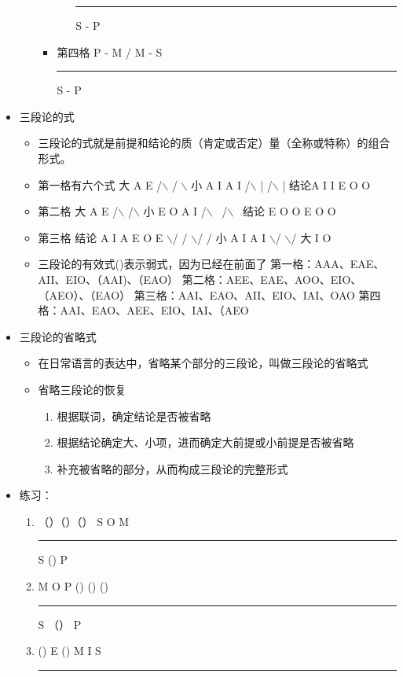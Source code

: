 \documentclass[11pt]{article}
\begin{document}
\begin{itemize}
\begin{itemize}
\begin{itemize}
\begin{itemize}
\rule{\linewidth}{0.5pt}
S - P
\end{itemize}
\item 第四格
P - M
  /
M - S

\rule{\linewidth}{0.5pt}
S - P
\end{itemize}
\end{itemize}
\item 三段论的式
\begin{itemize}
\item 三段论的式就是前提和结论的质（肯定或否定）量（全称或特称）的组合形式。
\item 第一格有六个式
大     A      E
      /$\backslash$    / $\backslash$
小   A  I   A  I
    /$\backslash$  |  /$\backslash$  |
结论A I  I E O  O
\item 第二格
大     A      E
      /$\backslash$     /$\backslash$
小    E O    A I
     /$\backslash$ \   /$\backslash$ \
结论 E O O  E O O
\item 第三格
结论   A  I A  E O E
       $\backslash$/ /    $\backslash$/ /
小      A I     A I
        $\backslash$/      $\backslash$/
大       I       O
\item 三段论的有效式()表示弱式，因为已经在前面了
第一格：AAA、EAE、AII、EIO、（AAI)、（EAO）
第二格：AEE、EAE、AOO、EIO、（AEO）、（EAO）
第三格：AAI、EAO、AII、EIO、IAI、OAO
第四格：AAI、EAO、AEE、EIO、IAI、（AEO
\end{itemize}
\item 三段论的省略式
\begin{itemize}
\item 在日常语言的表达中，省略某个部分的三段论，叫做三段论的省略式
\item 省略三段论的恢复
\begin{enumerate}
\item 根据联词，确定结论是否被省略
\item 根据结论确定大、小项，进而确定大前提或小前提是否被省略
\item 补充被省略的部分，从而构成三段论的完整形式
\end{enumerate}
\end{itemize}
\item 练习：
\begin{enumerate}
\item （）（）（）
S  O  M

\rule{\linewidth}{0.5pt}
S  () P
\item M  O  P
() () ()

\rule{\linewidth}{0.5pt}
S （） P
\item () E ()
M  I S

\rule{\linewidth}{0.5pt}
\end{enumerate}
\end{itemize}
\end{document}
